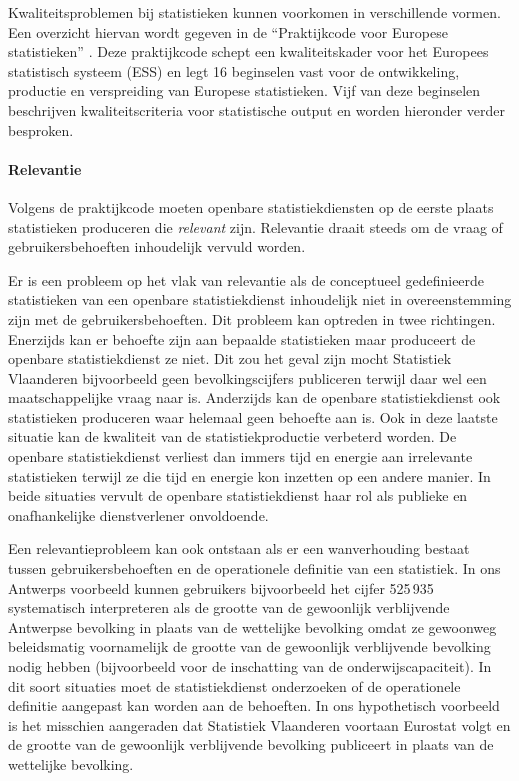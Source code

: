 \documentclass[\mainfiledir/00_handleiding_statistiekproductie.tex]{subfiles}
\begin{document}
Kwaliteitsproblemen bij statistieken kunnen voorkomen in verschillende vormen. Een overzicht hiervan wordt gegeven in de ``Praktijkcode voor Europese statistieken'' \parencite[zie][]{Eurostat2017European}. Deze praktijkcode schept een kwaliteitskader voor het Europees statistisch systeem (ESS) en legt 16 beginselen vast voor de ontwikkeling, productie en verspreiding van Europese statistieken. Vijf van deze beginselen beschrijven kwaliteitscriteria voor statistische output en worden hieronder verder besproken. 
	



\paragraph{Relevantie}

Volgens de praktijkcode moeten openbare statistiekdiensten op de eerste plaats statistieken produceren die \emph{relevant} zijn. Relevantie draait steeds om de vraag of gebruikersbehoeften inhoudelijk vervuld worden.

Er is een probleem op het vlak van relevantie als de conceptueel gedefinieerde statistieken van een openbare statistiekdienst inhoudelijk niet in overeenstemming zijn met de gebruikersbehoeften. Dit probleem kan optreden in twee richtingen. Enerzijds kan er behoefte zijn aan bepaalde statistieken maar produceert de openbare statistiekdienst ze niet. Dit zou het geval zijn mocht Statistiek Vlaanderen bijvoorbeeld geen bevolkingscijfers publiceren terwijl daar wel een maatschappelijke vraag naar is. Anderzijds kan de openbare statistiekdienst ook statistieken produceren waar helemaal geen behoefte aan is. Ook in deze laatste situatie kan de kwaliteit van de statistiekproductie verbeterd worden. De openbare statistiekdienst verliest dan immers tijd en energie aan irrelevante statistieken terwijl ze die tijd en energie kon inzetten op een andere manier. In beide situaties vervult de openbare statistiekdienst haar rol als publieke en onafhankelijke dienstverlener onvoldoende.

Een relevantieprobleem kan ook ontstaan als er een wanverhouding bestaat tussen gebruikersbehoeften en de operationele definitie van een statistiek. In ons Antwerps voorbeeld kunnen gebruikers bijvoorbeeld het cijfer 525\,935 systematisch interpreteren als de grootte van de gewoonlijk verblijvende Antwerpse bevolking in plaats van de wettelijke bevolking omdat ze gewoonweg beleidsmatig voornamelijk de grootte van de gewoonlijk verblijvende bevolking nodig hebben (bijvoorbeeld voor de inschatting van de onderwijscapaciteit). In dit soort situaties moet de statistiekdienst onderzoeken of de operationele definitie aangepast kan worden aan de behoeften. In ons hypothetisch voorbeeld is het misschien aangeraden dat Statistiek Vlaanderen voortaan Eurostat volgt en de grootte van de gewoonlijk verblijvende bevolking publiceert in plaats van de wettelijke bevolking.  
\end{document}

